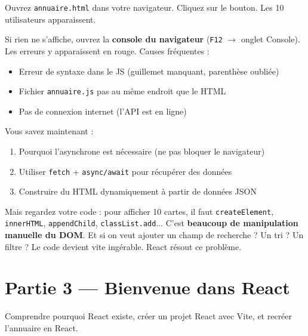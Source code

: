 \documentclass[11pt,a4paper]{article}
\begin{document}
Ouvrez \texttt{annuaire.html} dans votre navigateur. Cliquez sur le bouton. Les 10 utilisateurs apparaissent.

\begin{attentionbox}[Vérification]
Si rien ne s'affiche, ouvrez la \textbf{console du navigateur} (\texttt{F12} $\to$ onglet Console). Les erreurs y apparaissent en rouge. Causes fréquentes :
\begin{itemize}[nosep]
    \item Erreur de syntaxe dans le JS (guillemet manquant, parenthèse oubliée)
    \item Fichier \texttt{annuaire.js} pas au même endroit que le HTML
    \item Pas de connexion internet (l'API est en ligne)
\end{itemize}
\end{attentionbox}

\begin{retenirbox}
Vous savez maintenant :
\begin{enumerate}[nosep]
    \item Pourquoi l'asynchrone est nécessaire (ne pas bloquer le navigateur)
    \item Utiliser \texttt{fetch} + \texttt{async/await} pour récupérer des données
    \item Construire du HTML dynamiquement à partir de données JSON
\end{enumerate}
Mais regardez votre code : pour afficher 10 cartes, il faut \texttt{createElement}, \texttt{innerHTML}, \texttt{appendChild}, \texttt{classList.add}... C'est \textbf{beaucoup de manipulation manuelle du DOM}. Et si on veut ajouter un champ de recherche ? Un tri ? Un filtre ? Le code devient vite ingérable. React résout ce problème.
\end{retenirbox}

\newpage

\section{Partie 3 --- Bienvenue dans React}
\label{sec:react}

\begin{objectifbox}
Comprendre pourquoi React existe, créer un projet React avec Vite, et recréer l'annuaire en React.
\end{objectifbox}
\end{document}
